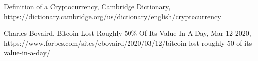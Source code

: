 \documentclass[conference]{IEEEtran}
\begin{document}
\begin{thebibliography}{00}

 Definition of a Cryptocurrency, Cambridge Dictionary, https://dictionary.cambridge.org/us/dictionary/english/cryptocurrency

 Charles Bovaird, Bitcoin Lost Roughly 50\% Of Its Value In A Day, Mar 12 2020,  https://www.forbes.com/sites/cbovaird/2020/03/12/bitcoin-lost-roughly-50-of-its-value-in-a-day/



\end{thebibliography}
\vspace{12pt}
\color{red}
\end{document}
